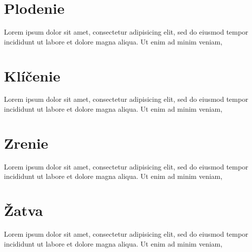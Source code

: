 \documentclass{book}
\begin{document}
\chapter{Plodenie}
Lorem ipsum dolor sit amet, consectetur adipisicing elit, sed do eiusmod
tempor incididunt ut labore et dolore magna aliqua. Ut enim ad minim veniam,

\chapter{Klíčenie}
Lorem ipsum dolor sit amet, consectetur adipisicing elit, sed do eiusmod
tempor incididunt ut labore et dolore magna aliqua. Ut enim ad minim veniam,

\chapter{Zrenie}
Lorem ipsum dolor sit amet, consectetur adipisicing elit, sed do eiusmod
tempor incididunt ut labore et dolore magna aliqua. Ut enim ad minim veniam,

\chapter{Žatva}
Lorem ipsum dolor sit amet, consectetur adipisicing elit, sed do eiusmod
tempor incididunt ut labore et dolore magna aliqua. Ut enim ad minim veniam,
\end{document}
